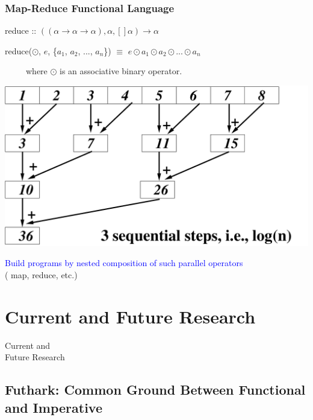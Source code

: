 \documentclass{beamer}
\newcommand{\blue}[1]{\textcolor{Blue}{{#1}}}
\renewcommand{\emph}[1]{\textcolor{structure}{#1}}
\newcommand{\emp}[1]{\textcolor{DikuRed}{ #1}}
\begin{document}
\begin{frame}[fragile,t]
   \frametitle{Map-Reduce Functional Language}

\bigskip

\emp{reduce} :: $((\alpha \rightarrow \alpha \rightarrow \alpha), \alpha, []\alpha) \rightarrow \alpha$

\smallskip

\emp{reduce}($\odot$, $e$, \{$a_1$, $a_2$, ..., $a_n$\}) $\equiv$ \emph{$e \odot a_1 \odot a_2 \odot ... \odot a_n$}

\smallskip

~~~~~where $\odot$ is an associative binary operator.

\bigskip

\begin{center} 
        \includegraphics[height=18ex]{Figures/ReduceEg.pdf} 
\end{center}\bigskip


\blue{Build programs by nested composition of such parallel operators}\\
(\emp{map}, \emp{reduce}, etc.)

\end{frame}

\section{Current and Future Research}

\begin{frame}
  \begin{center}
    \Huge
    Current and\\
    Future Research
  \end{center}
\end{frame}


\subsection{Futhark: Common Ground Between Functional and Imperative}

\end{document}
